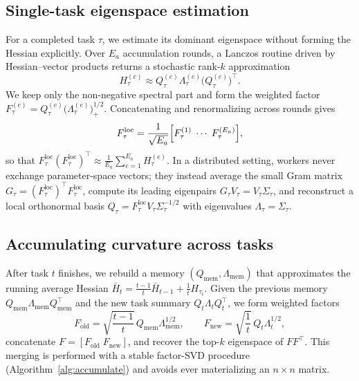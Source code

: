 \subsection{Single-task eigenspace estimation}

For a completed task $\tau$, we estimate its dominant eigenspace without forming the Hessian explicitly. Over $E_a$ accumulation rounds, a Lanczos routine driven by Hessian--vector products returns a stochastic rank-$k$ approximation
\begin{equation}
H_\tau^{(e)} \approx Q_\tau^{(e)} \Lambda_\tau^{(e)} \bigl(Q_\tau^{(e)}\bigr)^\top.
\end{equation}
We keep only the non-negative spectral part and form the weighted factor $F_\tau^{(e)} = Q_\tau^{(e)} \bigl(\Lambda_\tau^{(e)}\bigr)_+^{1/2}$. Concatenating and renormalizing across rounds gives
\begin{equation}
F_\tau^{\mathrm{loc}} = \frac{1}{\sqrt{E_a}} \Bigl[ F_\tau^{(1)} \; \cdots \; F_\tau^{(E_a)} \Bigr],
\end{equation}
so that $F_\tau^{\mathrm{loc}}(F_\tau^{\mathrm{loc}})^\top \approx \frac{1}{E_a}\sum_{e=1}^{E_a} H_\tau^{(e)}$. In a distributed setting, workers never exchange parameter-space vectors; they instead average the small Gram matrix $G_\tau = (F_\tau^{\mathrm{loc}})^\top F_\tau^{\mathrm{loc}}$, compute its leading eigenpairs $G_\tau V_\tau = V_\tau \Sigma_\tau$, and reconstruct a local orthonormal basis $Q_\tau = F_\tau^{\mathrm{loc}} V_\tau \Sigma_\tau^{-1/2}$ with eigenvalues $\Lambda_\tau = \Sigma_\tau$.

\subsection{Accumulating curvature across tasks}

After task $t$ finishes, we rebuild a memory $(Q_{\mathrm{mem}}, \Lambda_{\mathrm{mem}})$ that approximates the running average Hessian $\bar{H}_t = \frac{t-1}{t}\bar{H}_{t-1} + \frac{1}{t}H_{\tau_t}$. Given the previous memory $Q_{\mathrm{mem}} \Lambda_{\mathrm{mem}} Q_{\mathrm{mem}}^\top$ and the new task summary $Q_t \Lambda_t Q_t^\top$, we form weighted factors
\begin{equation}
F_{\mathrm{old}} = \sqrt{\frac{t-1}{t}}\, Q_{\mathrm{mem}} \Lambda_{\mathrm{mem}}^{1/2},
\qquad
F_{\mathrm{new}} = \sqrt{\frac{1}{t}}\, Q_t \Lambda_t^{1/2},
\end{equation}
concatenate $F = [F_{\mathrm{old}} \; F_{\mathrm{new}}]$, and recover the top-$k$ eigenspace of $FF^\top$. This merging is performed with a stable factor-SVD procedure (Algorithm~\ref{alg:accumulate}) and avoids ever materializing an $n \times n$ matrix.


